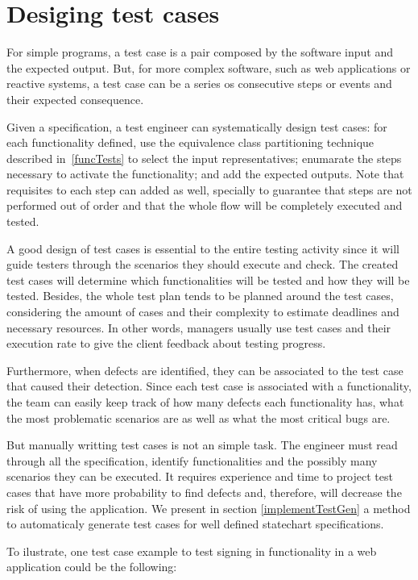 \section{Desiging test cases}
\label{sec:testcasesdesign}

For simple programs, a test case is a pair composed by the software input and the expected output. But, for more complex software, such as web applications or reactive systems, a test case can be a series os consecutive steps or events and their expected consequence.

Given a specification, a test engineer can systematically design test cases: for each functionality defined, use the equivalence class partitioning technique described in~\ref{funcTests} to select the input representatives; enumarate the steps necessary to activate the functionality; and add the expected outputs. Note that requisites to each step can added as well, specially to guarantee that steps are not performed out of order and that the whole flow will be completely executed and tested.

A good design of test cases is essential to the entire testing activity since it will guide testers through the scenarios they should execute and check. The created test cases will determine which functionalities will be tested and how they will be tested. Besides, the whole test plan tends to be planned around the test cases, considering the amount of cases and their complexity to estimate deadlines and necessary resources. In other words, managers usually use test cases and their execution rate to give the client feedback about testing progress.

Furthermore, when defects are identified, they can be associated to the test case that caused their detection. Since each test case is associated with a functionality, the team can easily keep track of how many defects each functionality has, what the most problematic scenarios are as well as what the most critical bugs are.

But manually writting test cases is not an simple task. The engineer must read through all the specification, identify functionalities and the possibly many scenarios they can be executed. It requires experience and time to project test cases that have more probability to find defects and, therefore, will decrease the risk of using the application. We present in section \ref{implementTestGen} a method to automaticaly generate test cases for well defined statechart specifications.

To ilustrate, one test case example to test signing in functionality in a web application could be the following:

